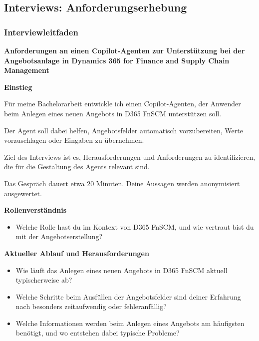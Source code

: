 \subsection{Interviews: Anforderungserhebung}
\subsubsection{Interviewleitfaden}
\label{anhang:InterviewleitfadenAnforderungserhebung}
\textbf{Anforderungen an einen Copilot-Agenten zur Unterstützung bei der Angebotsanlage in Dynamics 365 for Finance and Supply Chain Management}

\vspace{0.5em}

\textbf{Einstieg}

Für meine Bachelorarbeit entwickle ich einen Copilot-Agenten, der Anwender beim Anlegen eines neuen Angebots in D365 FnSCM unterstützen soll.

Der Agent soll dabei helfen, Angebotsfelder automatisch vorzubereiten, Werte vorzuschlagen oder Eingaben zu übernehmen.

Ziel des Interviews ist es, Herausforderungen und Anforderungen zu identifizieren, die für die Gestaltung des Agents relevant sind.

Das Gespräch dauert etwa 20 Minuten. Deine Aussagen werden anonymisiert ausgewertet.

\vspace{0.5em}

\textbf{Rollenverständnis}

\begin{itemize}
    \item Welche Rolle hast du im Kontext von D365 FnSCM, und wie vertraut bist du mit der Angebotserstellung?
\end{itemize}

\vspace{0.5em}

\textbf{Aktueller Ablauf und Herausforderungen}

\begin{itemize}
    \item Wie läuft das Anlegen eines neuen Angebots in D365 FnSCM aktuell typischerweise ab?
    \item Welche Schritte beim Ausfüllen der Angebotsfelder sind deiner Erfahrung nach besonders zeitaufwendig oder fehleranfällig?
    \item Welche Informationen werden beim Anlegen eines Angebots am häufigsten benötigt, und wo entstehen dabei typische Probleme?
\end{itemize}

